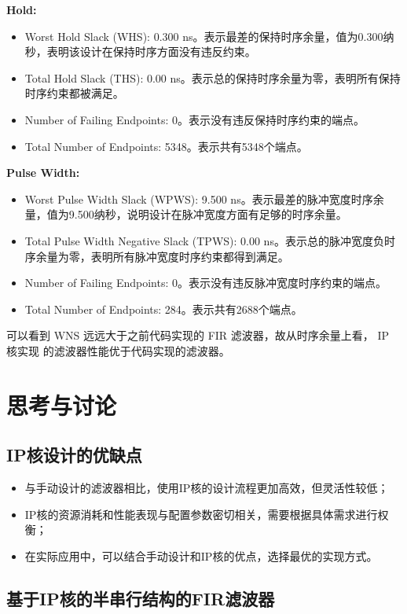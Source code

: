 \textbf{Hold:}  
\begin{itemize}
\item Worst Hold Slack (WHS): 0.300 ns。表示最差的保持时序余量，值为0.300纳秒，表明该设计在保持时序方面没有违反约束。  
\item Total Hold Slack (THS): 0.00 ns。表示总的保持时序余量为零，表明所有保持时序约束都被满足。  
\item Number of Failing Endpoints: 0。表示没有违反保持时序约束的端点。  
\item Total Number of Endpoints: 5348。表示共有5348个端点。
\end{itemize}

\textbf{Pulse Width:}  
\begin{itemize}
  \item Worst Pulse Width Slack (WPWS): 9.500 ns。表示最差的脉冲宽度时序余量，值为9.500纳秒，说明设计在脉冲宽度方面有足够的时序余量。  
  \item Total Pulse Width Negative Slack (TPWS): 0.00 ns。表示总的脉冲宽度负时序余量为零，表明所有脉冲宽度时序约束都得到满足。  
  \item Number of Failing Endpoints: 0。表示没有违反脉冲宽度时序约束的端点。  
\item Total Number of Endpoints: 284。表示共有2688个端点。
\end{itemize}

可以看到 WNS 远远大于之前代码实现的 FIR 滤波器，故从时序余量上看， IP 核实现 的滤波器性能优于代码实现的滤波器。
\section{思考与讨论}
\subsection{IP核设计的优缺点}
\begin{itemize}
    \item 与手动设计的滤波器相比，使用IP核的设计流程更加高效，但灵活性较低；
    \item IP核的资源消耗和性能表现与配置参数密切相关，需要根据具体需求进行权衡；
    \item 在实际应用中，可以结合手动设计和IP核的优点，选择最优的实现方式。
\end{itemize}
\subsection{基于IP核的半串行结构的FIR滤波器}

